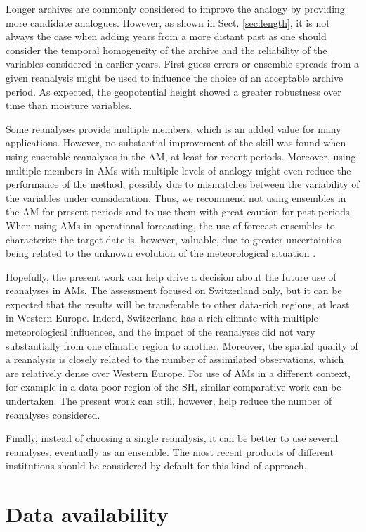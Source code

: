 \documentclass[smallextended]{svjour3}       %
\begin{document}
	Longer archives are commonly considered to improve the analogy by providing more candidate analogues. However, as shown in Sect. \ref{sec:length}, it is not always the case when adding years from a more distant past as one should consider the temporal homogeneity of the archive and the reliability of the variables considered in earlier years. First guess errors or ensemble spreads from a given reanalysis might be used to influence the choice of an acceptable archive period. As expected, the geopotential height showed a greater robustness over time than moisture variables. 
	
	Some reanalyses provide multiple members, which is an added value for many applications. However, no substantial improvement of the skill was found when using ensemble reanalyses in the AM, at least for recent periods. Moreover, using multiple members in AMs with multiple levels of analogy might even reduce the performance of the method, possibly due to mismatches between the variability of the variables under consideration. Thus, we recommend not using ensembles in the AM for present periods and to use them with great caution for past periods. When using AMs in operational forecasting, the use of forecast ensembles to characterize the target date is, however, valuable, due to greater uncertainties being related to the unknown evolution of the meteorological situation \citep{Thevenot2004}.
	
	Hopefully, the present work can help drive a decision about the future use of reanalyses in AMs. The assessment focused on Switzerland only, but it can be expected that the results will be transferable to other data-rich regions, at least in Western Europe. Indeed, Switzerland has a rich climate with multiple meteorological influences, and the impact of the reanalyses did not vary substantially from one climatic region to another. Moreover, the spatial quality of a reanalysis is closely related to the number of assimilated observations, which are relatively dense over Western Europe. For use of AMs in a different context, for example in a data-poor region of the SH, similar comparative work can be undertaken. The present work can still, however, help reduce the number of reanalyses considered.
	
	Finally, instead of choosing a single reanalysis, it can be better to use several reanalyses, eventually as an ensemble. The most recent products of different institutions should be considered by default for this kind of approach.
	
	
	\section*{Data availability}
	\label{sec:data-availability}
	
\end{document}
